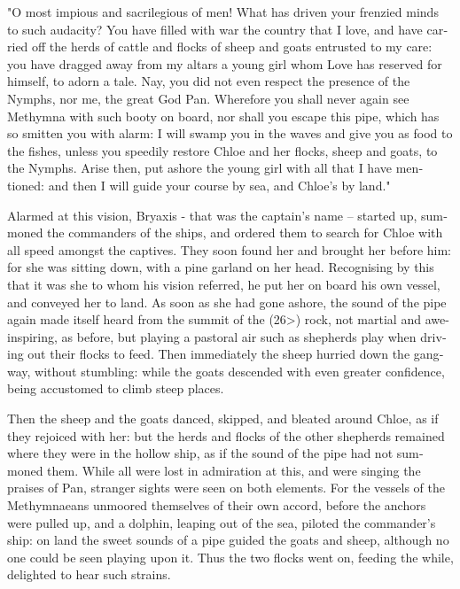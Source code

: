 \documentclass{book}
\begin{document}
\begin{pairs}
\begin{Rightside}
\begin{english}
  "O most impious and sacrilegious of men!  What has driven your frenzied minds to such audacity?  You have filled with war the country that I love, and have carried off the herds of cattle and flocks of sheep and goats entrusted to my care: you have dragged away from my altars a young girl whom Love has reserved for himself, to adorn a tale.  Nay, you did not even respect the presence of the Nymphs, nor me, the great God Pan.  Wherefore you shall never again see Methymna with such booty on board, nor shall you escape this pipe, which has so smitten you with alarm: I will swamp you in the waves and give you as food to the fishes, unless you speedily restore Chloe and her flocks, sheep and goats, to the Nymphs.  Arise then, put ashore the young girl with all that I have mentioned: and then I will guide your course by sea, and Chloe's by land."
\pend


  Alarmed at this vision, Bryaxis - that was the captain's name – started up, summoned the commanders of the ships, and ordered them to search for Chloe with all speed amongst the captives.  They soon found her and brought her before him: for she was sitting down, with a pine garland on her head.  Recognising by this that it was she to whom his vision referred, he put her on board his own vessel, and conveyed her to land.  As soon as she had gone ashore, the sound of the pipe again made itself heard from the summit of the (26>) rock, not martial and awe-inspiring, as before, but playing a pastoral air such as shepherds play when driving out their flocks to feed.  Then immediately the sheep hurried down the gangway, without stumbling: while the goats descended with even greater confidence, being accustomed to climb steep places.
\pend


  Then the sheep and the goats danced, skipped, and bleated around Chloe, as if they rejoiced with her: but the herds and flocks of the other shepherds remained where they were in the hollow ship, as if the sound of the pipe had not summoned them.  While all were lost in admiration at this, and were singing the praises of Pan, stranger sights were seen on both elements.  For the vessels of the Methymnaeans unmoored themselves of their own accord, before the anchors were pulled up, and a dolphin, leaping out of the sea, piloted the commander's ship: on land the sweet sounds of a pipe guided the goats and sheep, although no one could be seen playing upon it.  Thus the two flocks went on, feeding the while, delighted to hear such strains.
\pend



\end{english}
\end{Rightside}
\end{pairs}
\end{document}
